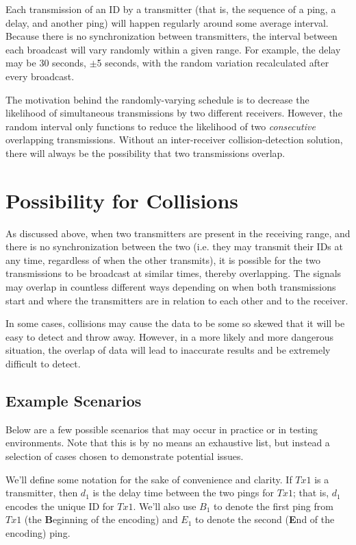 \documentclass[12pt]{article}
\begin{document}
Each transmission of an ID by a transmitter (that is, the sequence of a
ping, a delay, and another ping) will happen regularly around some average
interval.
Because there is no synchronization between transmitters, the interval
between each broadcast will vary randomly within a given range.
For example, the delay may be 30 seconds, $\pm$5 seconds, with the random
variation recalculated after every broadcast.

The motivation behind the randomly-varying schedule is to decrease the
likelihood of simultaneous transmissions by two different receivers.
However, the random interval only functions to reduce the likelihood of
two \emph{consecutive} overlapping transmissions.
Without an inter-receiver collision-detection solution, there will always
be the possibility that two transmissions overlap.

\section{Possibility for Collisions}

As discussed above,
when two transmitters are present in the receiving range, and there is no
synchronization between the two (i.e. they may transmit their IDs at any
time, regardless of when the other transmits), it is possible for the two
transmissions to be broadcast at similar times, thereby overlapping.
The signals may overlap in countless different ways depending on when
both transmissions start and where the transmitters are in relation to
each other and to the receiver.

In some cases, collisions may cause the data to be some so skewed that it will
be easy to detect and throw away. However, in a more likely and more dangerous
situation, the overlap of data will lead to inaccurate results and be extremely
difficult to detect.

\subsection{Example Scenarios}

Below are a few possible scenarios that may occur in practice or in testing
environments. Note that this is by no means an exhaustive list, but instead
a selection of cases chosen to demonstrate potential issues.

We'll define some notation for the sake of convenience and clarity.
If $Tx1$ is a transmitter, then $d_1$ is the delay time between
the two pings for $Tx1$; that is, $d_1$ encodes the unique ID for $Tx1$.
We'll also use $B_1$ to denote the first ping from $Tx1$
(the {\bf B}eginning of the encoding) and $E_1$ to denote the second
({\bf E}nd of the encoding) ping.
\end{document}
